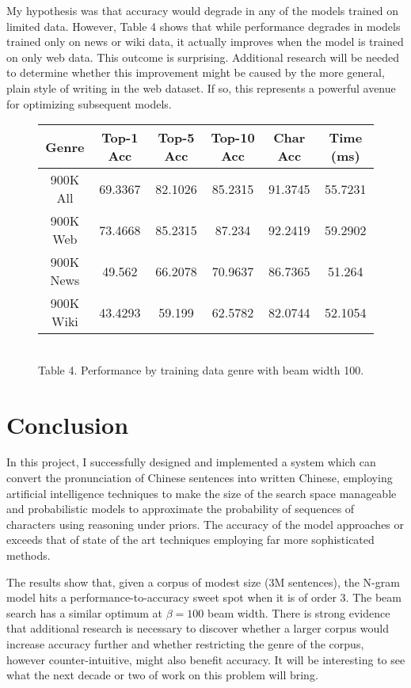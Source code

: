 \documentclass[11pt]{ctexart}
\begin{document}
My hypothesis was that accuracy would degrade in any of the models trained on
limited data. However, Table 4 shows that while performance degrades in models
trained only on news or wiki data, it actually improves when the model is trained
on only web data. This outcome is surprising. Additional research will be needed
to determine whether this improvement might be caused by the more general, plain style
of writing in the web dataset. If so, this represents a powerful avenue for
optimizing subsequent models.


\begin{figure}[htp]
\centering

\begin{tabular}{ c|c|c|c|c|c } 
Genre & Top-1 Acc & Top-5 Acc & Top-10 Acc & Char Acc & Time (ms) \\
\hline
900K All & 69.3367 & 82.1026 & 85.2315 & 91.3745 & 55.7231 \\
900K Web & 73.4668 & 85.2315 & 87.234 & 92.2419 & 59.2902 \\
900K News & 49.562 & 66.2078 & 70.9637 & 86.7365 & 51.264 \\
900K Wiki & 43.4293 & 59.199 & 62.5782 & 82.0744 & 52.1054 \\
\end{tabular}
\\
\vspace{5mm}
Table 4. Performance by training data genre with beam width 100.

\end{figure}


\section{Conclusion}

In this project, I successfully designed and implemented a system which can
convert the pronunciation of Chinese sentences into written Chinese, employing
artificial intelligence techniques to make the size of the search space manageable
and probabilistic models to approximate the probability of sequences of characters
using reasoning under priors. The accuracy of the model approaches or exceeds that
of state of the art techniques employing far more sophisticated methods.

The results show that, given a corpus of modest size (3M sentences), the
N-gram model hits a performance-to-accuracy sweet spot when it is of order 3.
The beam search has a similar optimum at $\beta = 100$ beam width.
There is strong evidence that additional research is necessary
to discover whether a larger corpus would increase accuracy further
and whether restricting the genre of the corpus, however counter-intuitive,
might also benefit accuracy. It will be interesting to see what the
next decade or two of work on this problem will bring.

\medskip

\printbibliography
\end{document}

